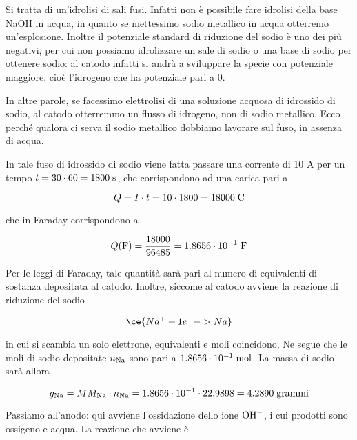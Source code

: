 \vspace{0.2cm}Si tratta di un'idrolisi di sali fusi. Infatti non è possibile fare idrolisi della base NaOH in acqua, in quanto se mettessimo sodio metallico in acqua otterremo un'esplosione. Inoltre il potenziale standard di riduzione del sodio è uno dei più negativi, per cui non possiamo idrolizzare un sale di sodio o una base di sodio per ottenere sodio: al catodo infatti si andrà a sviluppare la specie con potenziale maggiore, cioè l'idrogeno che ha potenziale pari a 0.

In altre parole, se facessimo elettrolisi di una soluzione acquosa di idrossido di sodio, al catodo otterremmo un flusso di idrogeno, non di sodio metallico. Ecco perché qualora ci serva il sodio metallico dobbiamo lavorare sul fuso, in assenza di acqua.

\vspace{0.2cm}In tale fuso di idrossido di sodio viene fatta passare una corrente di 10 A per un tempo $t=30 \cdot 60=1800 \; \rm s$, che corrispondono ad una carica pari a

\begin{equation*}
    Q=I \cdot t=10 \cdot 1800=18000 \; \rm C
\end{equation*}

che in Faraday corrispondono a

\begin{equation*}
    Q(\rm F)=\frac{18000}{96485}=1.8656 \cdot 10^{-1} \; F
\end{equation*}

Per le leggi di Faraday, tale quantità sarà pari al numero di equivalenti di sostanza depositata al catodo. Inoltre, siccome al catodo avviene la reazione di riduzione del sodio

\begin{equation*}
    \ce{Na^+ + 1e^- -> Na}
\end{equation*}

in cui si scambia un solo elettrone, equivalenti e moli coincidono, Ne segue che le moli di sodio depositate $n_{\rm Na}$ sono pari a $1.8656 \cdot 10^{-1} \; \rm mol$. La massa di sodio sarà allora

\begin{equation*}
    g_{\rm Na}=MM_{\rm Na} \cdot n_{\rm Na}
    =1.8656 \cdot 10^{-1} \cdot 22.9898
    =4.2890 \; \rm grammi
\end{equation*}

Passiamo all'anodo: qui avviene l'ossidazione dello ione $\rm OH^-$, i cui prodotti sono ossigeno e acqua. La reazione che avviene è

